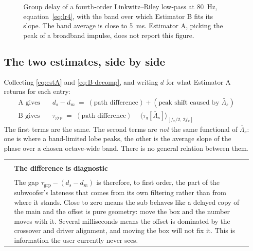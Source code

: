 \documentclass[11pt,a4paper]{article}
\makeatletter
\newenvironment{remark}[1]
  {\par\medskip\noindent\begin{tabular}{@{}p{0.03\textwidth}p{0.93\textwidth}@{}}
   \textcolor{smtblue}{\rule{2pt}{\baselineskip}} & \textbf{#1}\\[2pt] & \ignorespaces}
  {\end{tabular}\par\medskip}
\makeatother
\begin{document}
\begin{figure}[ht]
\centering
{}
\caption{Group delay of a fourth-order Linkwitz--Riley low-pass at
\SI{80}{\hertz}, equation~\eqref{eq:lr4}, with the band over which Estimator B
fits its slope. The band average is close to \SI{5}{\milli\second}. Estimator A,
picking the peak of a broadband impulse, does not report this figure.}
\label{fig:lr4}
\end{figure}

\subsection{The two estimates, side by side}

Collecting \eqref{eq:estA} and \eqref{eq:B-decomp}, and writing $d$ for what
Estimator A returns for each entry:
%
\begin{align}
  \text{A gives} \quad & d_s - d_m
    \;=\; (\text{path difference}) + (\text{peak shift caused by } \bar\Lambda_s)
    \label{eq:A-content}\\[2pt]
  \text{B gives} \quad & \tau_{\mathrm{grp}}
    \;=\; (\text{path difference}) + \bigl\langle \tau_g[\bar\Lambda_s] \bigr\rangle_{[f_x/2,\,2f_x]}
    \label{eq:B-content}
\end{align}
%
The first terms are the same. The second terms are \emph{not} the same
functional of $\bar\Lambda_s$: one is where a band-limited lobe peaks, the other is the
average slope of the phase over a chosen octave-wide band. There is no general
relation between them.

\begin{remark}{The difference is diagnostic}
The gap $\tau_{\mathrm{grp}} - (d_s - d_m)$ is therefore, to first order, the
part of the subwoofer's lateness that comes from its own filtering rather than
from where it stands. Close to zero means the sub behaves like a delayed copy of
the main and the offset is pure geometry: move the box and the number moves
with it. Several milliseconds means the offset is dominated by the crossover and
driver alignment, and moving the box will not fix it. This is information the
user currently never sees.
\end{remark}
\end{document}
